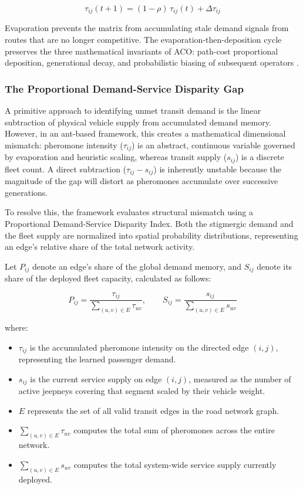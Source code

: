 {{\[
\tau_{ij}(t+1) = (1 - \rho)\,\tau_{ij}(t) + \Delta\tau_{ij}
\]

Evaporation prevents the matrix from accumulating stale demand signals from routes that are no longer competitive. The evaporation-then-deposition cycle preserves the three mathematical invariants of ACO: path-cost proportional deposition, generational decay, and probabilistic biasing of subsequent operators \citep{Dorigo1996, dorigo2004}.

\subsubsection{The Proportional Demand-Service Disparity Gap}
\label{sec:demand_service_gap}

A primitive approach to identifying unmet transit demand is the linear subtraction of physical vehicle supply from accumulated demand memory. However, in an ant-based framework, this creates a mathematical dimensional mismatch: pheromone intensity ($\tau_{ij}$) is an abstract, continuous variable governed by evaporation and heuristic scaling, whereas transit supply ($s_{ij}$) is a discrete fleet count. A direct subtraction ($\tau_{ij} - s_{ij}$) is inherently unstable because the magnitude of the gap will distort as pheromones accumulate over successive generations.

To resolve this, the framework evaluates structural mismatch using a Proportional Demand-Service Disparity Index. Both the stigmergic demand and the fleet supply are normalized into spatial probability distributions, representing an edge's relative share of the total network activity. 

Let $P_{ij}$ denote an edge's share of the global demand memory, and $S_{ij}$ denote its share of the deployed fleet capacity, calculated as follows:

\[
P_{ij} = \frac{\tau_{ij}}{\sum_{(u,v) \in E} \tau_{uv}}, \qquad S_{ij} = \frac{s_{ij}}{\sum_{(u,v) \in E} s_{uv}}
\]

where:
\begin{itemize}
    \setlength{\itemsep}{0pt}
    \setlength{\parskip}{0pt}
    \setlength{\parsep}{0pt}
    \item $\tau_{ij}$ is the accumulated pheromone intensity on the directed edge $(i, j)$, representing the learned passenger demand.
    \item $s_{ij}$ is the current service supply on edge $(i, j)$, measured as the number of active jeepneys covering that segment scaled by their vehicle weight.
    \item $E$ represents the set of all valid transit edges in the road network graph.
    \item $\sum_{(u,v) \in E} \tau_{uv}$ computes the total sum of pheromones across the entire network.
    \item $\sum_{(u,v) \in E} s_{uv}$ computes the total system-wide service supply currently deployed.
\end{itemize}

}}
